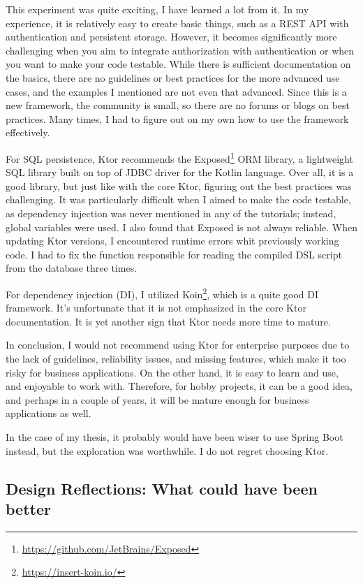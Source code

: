 This experiment was quite exciting, I have learned a lot from it. In my experience, it is relatively easy to create basic things, such as a REST API with authentication and persistent storage. However, it becomes significantly more challenging when you aim to integrate authorization with authentication or when you want to make your code testable. While there is sufficient documentation on the basics, there are no guidelines or best practices for the more advanced use cases, and the examples I mentioned are not even that advanced. Since this is a new framework, the community is small, so there are no forums or blogs on best practices. Many times, I had to figure out on my own how to use the framework effectively.

For SQL persistence, Ktor recommends the Exposed\footnote{\url{https://github.com/JetBrains/Exposed}} ORM library, a lightweight SQL library built on top of JDBC driver for the Kotlin language. Over all, it is a good library, but just like with the core Ktor, figuring out the best practices was challenging. It was particularly difficult when I aimed to make the code testable, as dependency injection was never mentioned in any of the tutorials; instead, global variables were used. I also found that Exposed is not always reliable. When updating Ktor versions, I encountered runtime errors whit previously working code. I had to fix the function responsible for reading the compiled DSL script from the database three times.

For dependency injection (DI), I utilized Koin\footnote{\url{https://insert-koin.io/}}, which is a quite good DI framework. It's unfortunate that it is not emphasized in the core Ktor documentation. It is yet another sign that Ktor needs more time to mature.

In conclusion, I would not recommend using Ktor for enterprise purposes due to the lack of guidelines, reliability issues, and missing features, which make it too risky for business applications. On the other hand, it is easy to learn and use, and enjoyable to work with. Therefore, for hobby projects, it can be a good idea, and perhaps in a couple of years, it will be mature enough for business applications as well.

In the case of my thesis, it probably would have been wiser to use Spring Boot instead, but the exploration was worthwhile. I do not regret choosing Ktor.

\subsection[Design Reflections]{Design Reflections: What could have been better}


